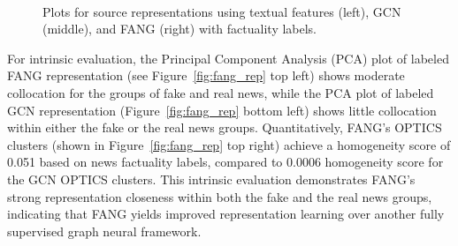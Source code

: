 \documentclass[sigconf]{acmart}
\theoremstyle{definition}
\theoremstyle{hypothesis}
\begin{document}
\begin{figure}[t]
\centering
{}
\\
\caption{Plots for source representations using textual features (left), GCN (middle), and FANG (right) with factuality labels.}
\label{fig:source_rep}
\end{figure}

For intrinsic evaluation, the Principal Component Analysis (PCA) plot of labeled FANG representation (see Figure~\ref{fig:fang_rep} top left) shows moderate collocation for the groups of fake and real news, while the PCA plot of labeled GCN representation (Figure~\ref{fig:fang_rep} bottom left) shows little collocation within either the fake or the real news groups. Quantitatively, FANG's OPTICS clusters (shown in Figure~\ref{fig:fang_rep} top right) achieve a homogeneity score of 0.051 based on news factuality labels, compared to 0.0006 homogeneity score for the GCN OPTICS clusters. This intrinsic evaluation demonstrates FANG's strong representation closeness within both the fake and the real news groups, indicating that FANG yields improved representation learning over another fully supervised graph neural framework. 
\end{document}
